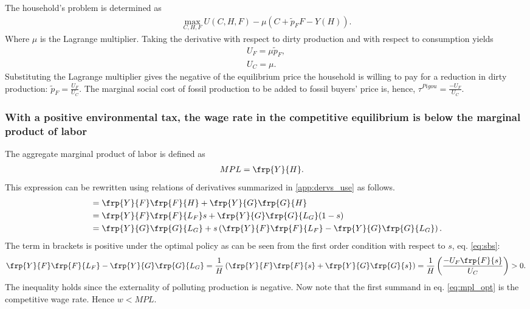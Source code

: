 The household's problem is determined as
\begin{align*}
\underset{C,H,F}{\max} U(C,H,F)-\mu \left(C+\tilde{p}_FF-Y(H)\right).
\end{align*}
Where $\mu$ is the Lagrange multiplier. Taking the derivative with respect to dirty production  and with respect to consumption yields
\begin{align*}
U_F=\mu \tilde{p}_F,\\
U_C=\mu.
\end{align*}
Substituting the Lagrange multiplier gives the negative of the equilibrium price the household is willing to pay for a reduction in dirty production: $\tilde{p}_F=\frac{U_F}{U_C}$. The marginal social cost of fossil production to be added to fossil buyers' price is, hence, $\tau^{Pigou}=\frac{-U_F}{U_C}$.


\subsubsection{With a positive environmental tax, the wage rate in the competitive equilibrium is below the marginal product of labor}\label{app:wageMPL}
The aggregate marginal product of labor is defined as
\begin{align}
MPL&= \frp{Y}{H}.\nonumber
\end{align}
This expression can be rewritten using relations of derivatives summarized in \ref{app:dervs_use} as follows.
\begin{align}
&= \frp{Y}{F}\frp{F}{H}+\frp{Y}{G}\frp{G}{H}\nonumber\\
&= \frp{Y}{F}\frp{F}{L_F}s+\frp{Y}{G}\frp{G}{L_G}(1-s)\nonumber\\
&= \frp{Y}{G}\frp{G}{L_G}+ s\left(\frp{Y}{F}\frp{F}{L_F}-\frp{Y}{G}\frp{G}{L_G}\right).\label{eq:mpl_opt}
\end{align}
The term in brackets is positive under the optimal policy as can be seen from the first order condition with respect to $s$, eq. \eqref{eq:sbs}:
\begin{align}
\frp{Y}{F}\frp{F}{L_F}-\frp{Y}{G}\frp{G}{L_G}=\frac{1}{H}\left(\frp{Y}{F}\frp{F}{s}+\frp{Y}{G}\frp{G}{s}\right)=\frac{1}{H}\left(\frac{-U_F\frp{F}{s}}{U_C}\right)>0.\nonumber
\end{align}
The inequality holds since the externality of polluting production is negative. %
Now note that the first summand in eq. \eqref{eq:mpl_opt} is the competitive wage rate.  Hence $w<MPL$.

